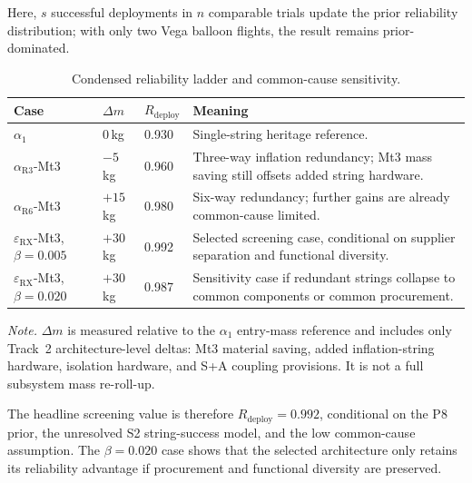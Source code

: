 Here, $s$ successful deployments in $n$ comparable trials update the prior reliability distribution; with only two Vega balloon flights, the result remains prior-dominated.

\begin{table}[H]
\centering
\footnotesize
\renewcommand{\arraystretch}{1}
\caption{Condensed reliability ladder and common-cause sensitivity.}
\label{tab:reliability_ladder}
\begin{tabularx}{\textwidth}{@{}p{} p{} p{} X@{}}
\toprule
\textbf{Case} & \textbf{$\Delta m$} & \textbf{$R_{\mathrm{deploy}}$} & \textbf{Meaning} \\
\midrule
$\alpha_1$ & 0\,kg & 0.930 & Single-string heritage reference. \\
$\alpha_{\mathrm{R3}}$-Mt3 & $-5$\,kg & 0.960 & Three-way inflation redundancy; Mt3 mass saving still offsets added string hardware. \\
$\alpha_{\mathrm{R6}}$-Mt3 & $+15$\,kg & 0.980 & Six-way redundancy; further gains are already common-cause limited. \\
$\varepsilon_{\mathrm{RX}}$-Mt3, $\beta=0.005$ & $+30$\,kg & 0.992 & Selected screening case, conditional on supplier separation and functional diversity. \\
$\varepsilon_{\mathrm{RX}}$-Mt3, $\beta=0.020$ & $+30$\,kg & 0.987 & Sensitivity case if redundant strings collapse to common components or common procurement. \\
\bottomrule
\end{tabularx}

\vspace{0.25em}
\begin{minipage}{0.96\textwidth}
\footnotesize
\emph{Note.} $\Delta m$ is measured relative to the $\alpha_1$ entry-mass reference and includes only Track~2 architecture-level deltas: Mt3 material saving, added inflation-string hardware, isolation hardware, and S+A coupling provisions. It is not a full subsystem mass re-roll-up.
\end{minipage}
\end{table}

The headline screening value is therefore $R_{\mathrm{deploy}}=0.992$, conditional on the P8 prior, the unresolved S2 string-success model, and the low common-cause assumption. The $\beta=0.020$ case shows that the selected architecture only retains its reliability advantage if procurement and functional diversity are preserved.


